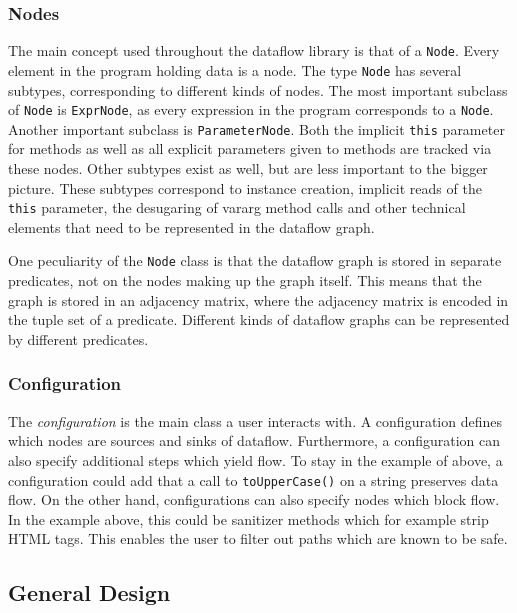 \subsubsection*{Nodes}
The main concept used throughout the dataflow library is that of a \texttt{Node}.
Every element in the program holding data is a node.
The type \texttt{Node} has several subtypes, corresponding to different kinds of nodes.
The most important subclass of \texttt{Node} is \texttt{ExprNode}, 
as every expression in the program corresponds to a \texttt{Node}.
Another important subclass is \texttt{ParameterNode}.
Both the implicit \texttt{this} parameter for methods as well as all explicit parameters
given to methods are tracked via these nodes.
Other subtypes exist as well, but are less important to the bigger picture.
These subtypes correspond to instance creation, implicit reads of the \texttt{this} parameter,
the desugaring of vararg method calls and other technical elements that need to be 
represented in the dataflow graph.

One peculiarity of the \texttt{Node} class is that the dataflow graph
is stored in separate predicates, not on the nodes making up the graph itself.
This means that the graph is stored in an adjacency matrix, where the adjacency matrix is encoded in the tuple 
set of a predicate.
Different kinds of dataflow graphs can be represented by different predicates.

\subsubsection*{Configuration}
The \emph{configuration} is the main class a user interacts with.
A configuration defines which nodes are sources and sinks of dataflow.
Furthermore, a configuration can also specify additional steps which yield flow.
To stay in the example of above, a configuration could add that a call to 
\texttt{toUpperCase()} on a string preserves data flow.
On the other hand, configurations can also specify nodes which block flow.
In the example above, this could be sanitizer methods which for example strip HTML tags.
This enables the user to filter out paths which are known to be safe.


\subsection{General Design}


